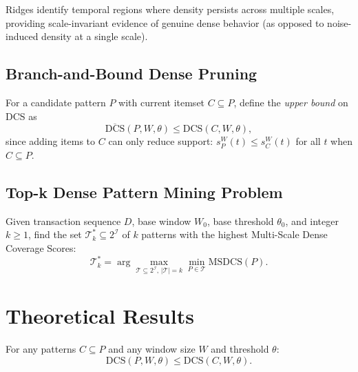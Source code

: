 Ridges identify temporal regions where density persists across multiple
scales, providing scale-invariant evidence of genuine dense behavior
(as opposed to noise-induced density at a single scale).

\subsection{Branch-and-Bound Dense Pruning}

\begin{definition}\label{def:upper_bound}
For a candidate pattern $P$ with current itemset $C \subseteq P$,
define the \emph{upper bound} on DCS as
\begin{equation}
\overline{\mathrm{DCS}}(P, W, \theta) \leq \mathrm{DCS}(C, W, \theta),
\end{equation}
since adding items to $C$ can only reduce support:
$s_P^W(t) \leq s_C^W(t)$ for all $t$ when $C \subseteq P$.
\end{definition}

\subsection{Top-k Dense Pattern Mining Problem}

\begin{definition}\label{def:topk_problem}
Given transaction sequence $D$, base window $W_0$, base threshold $\theta_0$,
and integer $k \geq 1$, find the set $\mathcal{T}_k^* \subseteq 2^{\mathcal{I}}$
of $k$ patterns with the highest Multi-Scale Dense Coverage Scores:
\begin{equation}
\mathcal{T}_k^* = \arg\max_{\mathcal{T} \subseteq 2^{\mathcal{I}},\, |\mathcal{T}| = k}
  \min_{P \in \mathcal{T}} \mathrm{MSDCS}(P).
\end{equation}
\end{definition}

\section{Theoretical Results}\label{sec:theorems}

\begin{theorem}\label{thm:antimonotone}
For any patterns $C \subseteq P$ and any window size $W$ and threshold $\theta$:
\begin{equation}
\mathrm{DCS}(P, W, \theta) \leq \mathrm{DCS}(C, W, \theta).
\end{equation}
\end{theorem}

